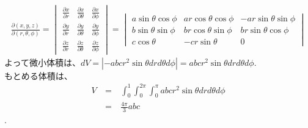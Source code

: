 \documentclass[a4paper,11pt,fleqn]{jarticle}
\begin{document}
\begin{eqnarray*}
\frac{\partial (x, y, z)}{\partial (r , \theta , \phi )}=
\begin{vmatrix}
\frac{\partial x}{\partial r}  &\frac{\partial x}{\partial \theta}  &\frac{\partial x}{\partial \phi} \\
\frac{\partial y}{\partial r}  &\frac{\partial y}{\partial \theta}  &\frac{\partial y}{\partial \phi} \\
\frac{\partial z}{\partial r}  &\frac{\partial z}{\partial \theta}  &\frac{\partial z}{\partial \phi}
\end{vmatrix}
=
\begin{vmatrix}
a\sin\theta\cos\phi &ar\cos\theta\cos\phi &-ar\sin\theta\sin\phi \\
b\sin\theta\sin\phi &br\cos\theta\sin\phi &br\sin\theta\cos\phi \\
c\cos\theta &-cr\sin\theta &0
\end{vmatrix}
\end{eqnarray*}
よって微小体積は、$dV=|-abcr^2\sin\theta drd\theta d\phi |=abcr^2\sin\theta drd\theta d\phi$.
\\
もとめる体積は、
\begin{eqnarray*}
V &~=~& \int_0^1 \int_0^{2\pi} \int_0^{\pi}abcr^2\sin\theta drd\theta d\phi \\
&~=~& \frac{4\pi}{3}abc
\end{eqnarray*}.
\end{document}
